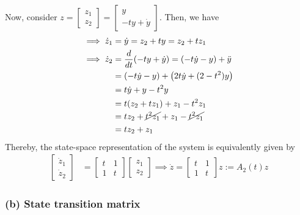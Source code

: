 Now, consider \( z = \begin{bmatrix} z_1 \\ z_2 \end{bmatrix} = \begin{bmatrix} y \\ -t y + \dot y \end{bmatrix} \).
Then, we have
\begin{align*}
    \implies
    \dot z_1
     & =
    \dot y = z_2 + t y
    =
    z_2 + t z_1
    \\
    \implies
    \dot z_2
     & =
    \frac{d}{dt} (-t y + \dot y)
    =
    (-t \dot y - y) + \ddot y
    \\ & =
    (-t \dot y - y) + \left( 2t \dot y + (2 - t^2)y \right)
    \\ & =
    t \dot y + y - t^2 y
    \\ & =
    t (z_2 + t z_1) + z_1 - t^2 z_1
    \\ & =
    t z_2 + \cancel{t^2 z_1} + z_1 - \cancel{t^2 z_1}
    \\ & =
    t z_2 + z_1
\end{align*}
Thereby, the state-space representation of the system is equivalently given by
\begin{align*}
    \begin{bmatrix}
        \dot z_1 \\
        \dot z_2
    \end{bmatrix}
     & =
    \begin{bmatrix}
        t & 1 \\
        1 & t
    \end{bmatrix}
    \begin{bmatrix}
        z_1 \\
        z_2
    \end{bmatrix}
    \implies
    \dot z
    =
    \begin{bmatrix}
        t & 1 \\
        1 & t
    \end{bmatrix}
    z
    :=
    A_2(t) z
\end{align*}

\subsubsection*{(b) State transition matrix}


